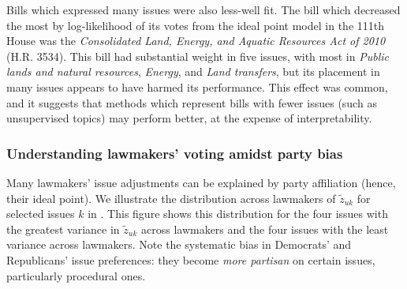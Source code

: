 Bills which expressed many issues were also less-well fit.  The bill
which decreased the most by log-likelihood of its votes from the ideal
point model in the 111th House was the \emph{Consolidated Land,
  Energy, and Aquatic Resources Act of 2010} (H.R. 3534).  This bill
had substantial weight in five issues, with most in \emph{Public lands
  and natural resources}, \emph{Energy}, and \emph{Land transfers},
but its placement in many issues appears to have harmed its
performance.  This effect was common, and it suggests that methods
which represent bills with fewer issues (such as unsupervised topics)
may perform better, at the expense of interpretability.

\subsubsection{Understanding lawmakers' voting amidst party bias}
\label{sec:party_bias}
Many lawmakers' issue adjustments can be explained by party
affiliation (hence, their ideal point).  We illustrate the
distribution across lawmakers of $\tilde z_{uk}$ for selected issues
$k$ in .  This figure shows this
distribution for the four issues with the greatest variance in $\tilde
z_{uk}$ across lawmakers and the four issues with the least variance
across lawmakers. Note the systematic bias in Democrats' and
Republicans' issue preferences: they become \emph{more partisan} on
certain issues, particularly procedural ones.

